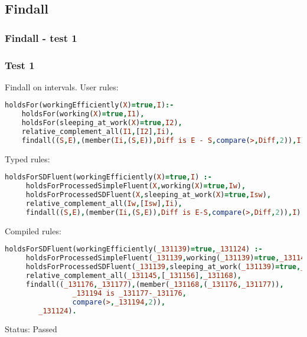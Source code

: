 \documentclass[8pt]{beamer}
\begin{document}
\subsection{Findall}
\begin{frame}[fragile]
\frametitle{Findall - test 1}
\subsubsection{Test 1}
\small
Findall on intervals.\linebreak
User rules:
\begin{tiny}
\begin{lstlisting}[language=Prolog]
holdsFor(workingEfficiently(X)=true,I):-
    holdsFor(working(X)=true,I1),
    holdsFor(sleeping_at_work(X)=true,I2),
    relative_complement_all(I1,[I2],Ii),
    findall((S,E),(member(Ii,(S,E)),Diff is E - S,compare(>,Diff,2)),I).
\end{lstlisting}
\end{tiny}
Typed rules:
\begin{tiny}
\begin{lstlisting}[language=Prolog]
holdsForSDFluent(workingEfficiently(X)=true,I) :-
     holdsForProcessedSimpleFluent(X,working(X)=true,Iw),
     holdsForProcessedSDFluent(X,sleeping_at_work(X)=true,Isw),
     relative_complement_all(Iw,[Isw],Ii),
     findall((S,E),(member(Ii,(S,E)),Diff is E-S,compare(>,Diff,2)),I).
\end{lstlisting}
\end{tiny}
Compiled rules:
\begin{tiny}
\begin{lstlisting}[language=Prolog]
holdsForSDFluent(workingEfficiently(_131139)=true,_131124) :-
     holdsForProcessedSimpleFluent(_131139,working(_131139)=true,_131145),
     holdsForProcessedSDFluent(_131139,sleeping_at_work(_131139)=true,_131156),
     relative_complement_all(_131145,[_131156],_131168),
     findall((_131176,_131177),(member(_131168,(_131176,_131177)),
				_131194 is _131177-_131176,
				compare(>,_131194,2)),
		_131124).
\end{lstlisting}
\end{tiny}
Status: Passed
\end{frame}
\end{document}
